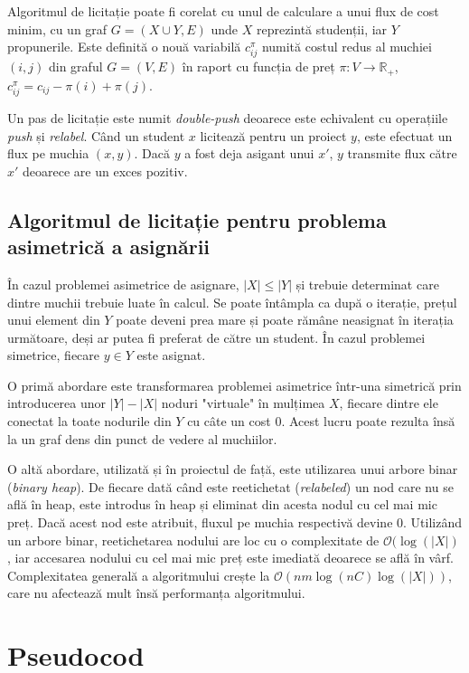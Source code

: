 Algoritmul de licitație poate fi corelat cu unul de calculare a unui flux de cost minim, cu un graf $G=(X \cup Y, E)$ unde $X$ reprezintă studenții, iar $Y$ propunerile. Este definită o nouă variabilă 
$c_{ij}^\pi$ numită costul redus al muchiei $(i, j)$ din graful $G=(V, E)$ în raport cu funcția de preț $\pi: V \rightarrow \mathbb{R}_+$,\; $c_{ij}^\pi = c_{ij} - \pi(i) + \pi(j)$.

Un pas de licitație este numit \textit{double-push} deoarece este echivalent cu operațiile \textit{push} și \textit{relabel}. Când un student $x$ licitează pentru un proiect $y$, este efectuat un flux pe muchia $(x, y)$. Dacă $y$ a fost deja asigant unui $x'$, $y$ transmite flux către $x'$ deoarece are un exces pozitiv.

\subsection{Algoritmul de licitație pentru problema asimetrică a asignării}

În cazul problemei asimetrice de asignare, $|X| \leq |Y|$ și trebuie determinat care dintre muchii trebuie luate în calcul. Se poate întâmpla ca după o iterație, prețul unui element din $Y$ poate deveni prea mare și poate rămâne neasignat în iterația următoare, deși ar putea fi preferat de către un student. În cazul problemei simetrice, fiecare $y \in Y$ este asignat.

O primă abordare este transformarea problemei asimetrice într-una simetrică prin introducerea unor $|Y| - |X|$ noduri "virtuale" în mulțimea $X$, fiecare dintre ele conectat la toate nodurile din $Y$  cu câte un cost 0. Acest lucru poate rezulta însă la un graf dens din punct de vedere al muchiilor.

O altă abordare, utilizată și în proiectul de față, este utilizarea unui arbore binar (\textit{binary heap}). De fiecare dată când este reetichetat (\textit{relabeled}) un nod care nu se află în heap, este introdus în heap și eliminat din acesta nodul cu cel mai mic preț. Dacă acest nod este atribuit, fluxul pe muchia respectivă devine 0. Utilizând un arbore binar, reetichetarea nodului are loc cu o complexitate de $\mathcal{O}(\log(|X|)$, iar accesarea nodului cu cel mai mic preț este imediată deoarece se află în vârf. Complexitatea generală a algoritmului crește la $\mathcal{O}(n m \log(n C) \log(|X|))$, care nu afectează mult însă performanța algoritmului.

\section{Pseudocod}

